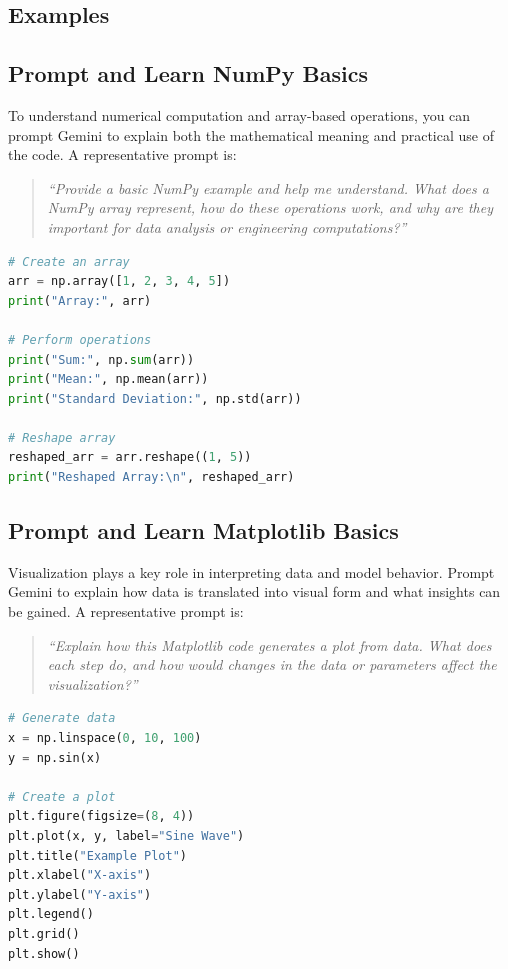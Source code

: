 \documentclass[12pt]{article}
\begin{document}
\subsection*{Examples}

\subsection*{Prompt and Learn NumPy Basics}

To understand numerical computation and array-based operations, you can prompt Gemini to explain both the mathematical meaning and practical use of the code.  
A representative prompt is:

\begin{quote}
\emph{``Provide a basic NumPy example and help me understand. What does a NumPy array represent, how do these operations work, and why are they important for data analysis or engineering computations?''}
\end{quote}

\begin{lstlisting}[language=Python]
# Create an array
arr = np.array([1, 2, 3, 4, 5])
print("Array:", arr)

# Perform operations
print("Sum:", np.sum(arr))
print("Mean:", np.mean(arr))
print("Standard Deviation:", np.std(arr))

# Reshape array
reshaped_arr = arr.reshape((1, 5))
print("Reshaped Array:\n", reshaped_arr)
\end{lstlisting}

\subsection*{Prompt and Learn Matplotlib Basics}

Visualization plays a key role in interpreting data and model behavior. Prompt Gemini to explain how data is translated into visual form and what insights can be gained.  
A representative prompt is:

\begin{quote}
\emph{``Explain how this Matplotlib code generates a plot from data. What does each step do, and how would changes in the data or parameters affect the visualization?''}
\end{quote}

\begin{lstlisting}[language=Python]
# Generate data
x = np.linspace(0, 10, 100)
y = np.sin(x)

# Create a plot
plt.figure(figsize=(8, 4))
plt.plot(x, y, label="Sine Wave")
plt.title("Example Plot")
plt.xlabel("X-axis")
plt.ylabel("Y-axis")
plt.legend()
plt.grid()
plt.show()
\end{lstlisting}
\end{document}
